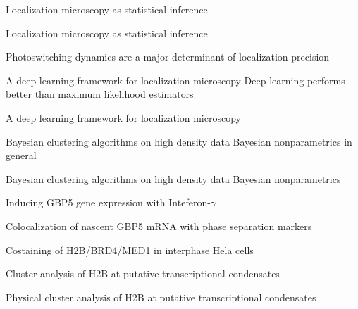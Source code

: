 \documentclass{beamer}					%
\begin{document}
\begin{frame}{Localization microscopy as statistical inference}
\end{frame}


\begin{frame}{Localization microscopy as statistical inference}
\end{frame}

\begin{frame}{Photoswitching dynamics are a major determinant of localization precision}
\end{frame}

\begin{frame}{A deep learning framework for localization microscopy}
Deep learning performs better than maximum likelihood estimators
\end{frame}

\begin{frame}{A deep learning framework for localization microscopy}
\end{frame}

\begin{frame}{Bayesian clustering algorithms on high density data}
Bayesian nonparametrics in general
\end{frame}

\begin{frame}{Bayesian clustering algorithms on high density data}
Bayesian nonparametrics
\end{frame}

\begin{frame}{Inducing GBP5 gene expression with Inteferon-$\gamma$}
\end{frame}

\begin{frame}{Colocalization of nascent GBP5 mRNA with phase separation markers}
\end{frame}

\begin{frame}{Costaining of H2B/BRD4/MED1 in interphase Hela cells}
\end{frame}

\begin{frame}{Cluster analysis of H2B at putative transcriptional condensates}
\end{frame}

\begin{frame}{Physical cluster analysis of H2B at putative transcriptional condensates}
\end{frame}
\end{document}
